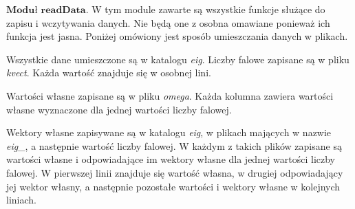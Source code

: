 \vspace {3mm}
 \( \textbf{Moduł readData} \).
W tym module zawarte są wszystkie funkcje służące do zapisu i wczytywania danych. Nie będą one z osobna omawiane ponieważ ich funkcja jest jasna. Poniżej omówiony jest sposób umieszczania danych w plikach.

Wszystkie dane umieszczone są w katalogu \textit{eig}. Liczby falowe zapisane są w pliku \textit{kvect}. Każda wartość znajduje się w osobnej lini.

Wartości własne zapisane są w pliku \textit{omega}. Każda kolumna zawiera wartości własne wyznaczone dla jednej wartości liczby falowej.

Wektory własne zapisywane są w katalogu \textit{eig}, w plikach mających w nazwie \textit{eig\_}, a następnie wartość liczby falowej. W każdym z takich plików zapisane są wartości własne i odpowiadające im wektory własne dla jednej wartości liczby falowej. W pierwszej linii znajduje się wartość własna, w drugiej odpowiadający jej wektor własny, a następnie pozostałe wartości i wektory własne w kolejnych liniach.